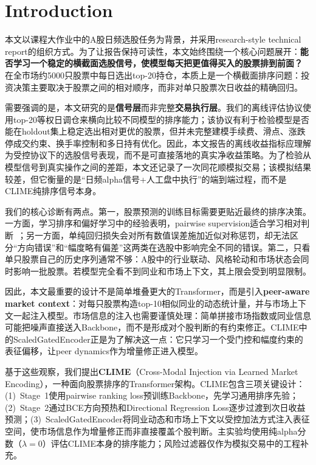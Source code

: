 \section{Introduction}
\label{sec:intro}

本文以课程大作业中的A股日频选股任务为背景，并采用research-style technical report的组织方式。为了让报告保持可读性，本文始终围绕一个核心问题展开：\textbf{能否学习一个稳定的横截面选股信号，使模型每天把更值得买入的股票排到前面？} 在全市场约5000只股票中每日选出top-20持仓，本质上是一个横截面排序问题：投资决策主要取决于股票之间的相对顺序，而非对单只股票次日收益的精确回归。

需要强调的是，本文研究的是\textbf{信号层}而非完整\textbf{交易执行层}。我们的离线评估协议使用top-20等权日调仓来横向比较不同模型的排序能力；该协议有利于检验模型是否能在holdout集上稳定选出相对更优的股票，但并未完整建模手续费、滑点、涨跌停成交约束、换手率控制和多日持有优化。因此，本文报告的离线收益指标应理解为受控协议下的选股信号表现，而不是可直接落地的真实净收益策略。为了检验从模型信号到真实操作之间的差距，本文还记录了一次同花顺模拟交易；该模拟结果较差，但它衡量的是“日频alpha信号+人工盘中执行”的端到端过程，而不是CLIME纯排序信号本身。

我们的核心诊断有两点。第一，股票预测的训练目标需要更贴近最终的排序决策。一方面，学习排序和偏好学习中的经验表明，pairwise supervision适合学习相对判断~\cite{joachims2002optimizing,burges2005learning,rendle2009bpr,christiano2017deep,ouyang2022training}；另一方面，单纯回归损失会对所有数值误差施加近似对称惩罚，却无法区分“方向错误”和“幅度略有偏差”这两类在选股中影响完全不同的错误。第二，只看单只股票自己的历史序列通常不够：A股中的行业联动、风格轮动和市场状态会同时影响一批股票。若模型完全看不到同业和市场上下文，其上限会受到明显限制。

因此，本文最重要的设计不是简单堆叠更大的Transformer，而是引入\textbf{peer-aware market context}：对每只股票构造top-10相似同业的动态统计量，并与市场上下文一起注入模型。市场信息的注入也需要谨慎处理：简单拼接市场指数或同业信息可能把噪声直接送入Backbone，而不是形成对个股判断的有约束修正。CLIME中的ScaledGatedEncoder正是为了解决这一点：它只学习一个受门控和幅度约束的表征偏移，让peer dynamics作为增量修正进入模型。

基于这些观察，我们提出\textbf{CLIME}（Cross-Modal Injection via Learned Market Encoding），一种面向股票排序的Transformer架构。CLIME包含三项关键设计：(1)~Stage~1使用pairwise ranking loss预训练Backbone，先学习通用排序先验；(2)~Stage~2通过BCE方向预热和Directional Regression Loss逐步过渡到次日收益预测；(3)~ScaledGatedEncoder将同业动态和市场上下文以受控加法方式注入表征空间，使市场信息作为增量修正而非直接覆盖个股判断。主实验均使用纯alpha分数（$\lambda=0$）评估CLIME本身的排序能力；风险过滤器仅作为模拟交易中的工程补充。

